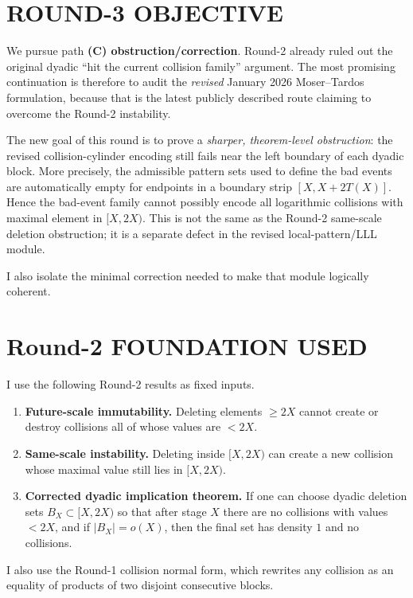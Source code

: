 \section{ROUND-3 OBJECTIVE}

We pursue path \textbf{(C) obstruction/correction}. Round-2 already ruled out the original dyadic ``hit the current collision family'' argument. The most promising continuation is therefore to audit the \emph{revised} January 2026 Moser--Tardos formulation, because that is the latest publicly described route claiming to overcome the Round-2 instability.

The new goal of this round is to prove a \emph{sharper, theorem-level obstruction}: the revised collision-cylinder encoding still fails near the left boundary of each dyadic block. More precisely, the admissible pattern sets used to define the bad events are automatically empty for endpoints in a boundary strip $[X,X+2T(X)]$. Hence the bad-event family cannot possibly encode all logarithmic collisions with maximal element in $[X,2X)$. This is not the same as the Round-2 same-scale deletion obstruction; it is a separate defect in the revised local-pattern/LLL module.

I also isolate the minimal correction needed to make that module logically coherent.

\section{Round-2 FOUNDATION USED}

I use the following Round-2 results as fixed inputs.

\begin{enumerate}
\item \textbf{Future-scale immutability.} Deleting elements $\ge 2X$ cannot create or destroy collisions all of whose values are $<2X$.
\item \textbf{Same-scale instability.} Deleting inside $[X,2X)$ can create a new collision whose maximal value still lies in $[X,2X)$.
\item \textbf{Corrected dyadic implication theorem.} If one can choose dyadic deletion sets $B_X\subset[X,2X)$ so that after stage $X$ there are no collisions with values $<2X$, and if $|B_X|=o(X)$, then the final set has density $1$ and no collisions.
\end{enumerate}

I also use the Round-1 collision normal form, which rewrites any collision as an equality of products of two disjoint consecutive blocks.

